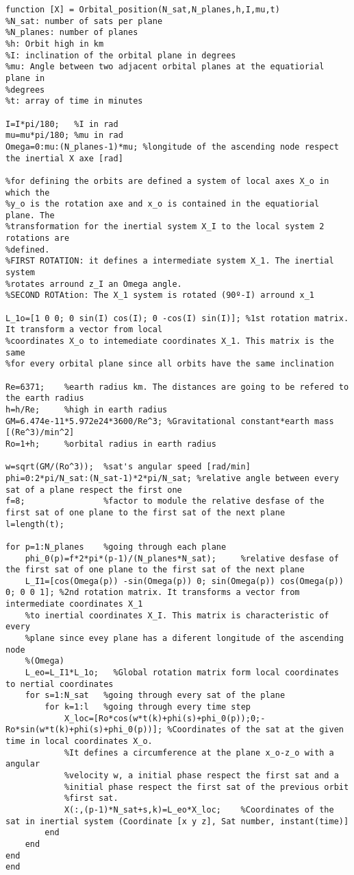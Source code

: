 \documentclass[10pt,a4paper]{article}
\author{Sergi Tarroc}
\begin{document}
\begin{lstlisting}
function [X] = Orbital_position(N_sat,N_planes,h,I,mu,t)
%N_sat: number of sats per plane
%N_planes: number of planes
%h: Orbit high in km
%I: inclination of the orbital plane in degrees
%mu: Angle between two adjacent orbital planes at the equatiorial plane in
%degrees
%t: array of time in minutes

I=I*pi/180;   %I in rad
mu=mu*pi/180; %mu in rad
Omega=0:mu:(N_planes-1)*mu; %longitude of the ascending node respect the inertial X axe [rad]

%for defining the orbits are defined a system of local axes X_o in which the
%y_o is the rotation axe and x_o is contained in the equatiorial plane. The
%transformation for the inertial system X_I to the local system 2 rotations are
%defined. 
%FIRST ROTATION: it defines a intermediate system X_1. The inertial system
%rotates arround z_I an Omega angle. 
%SECOND ROTAtion: The X_1 system is rotated (90º-I) arround x_1

L_1o=[1 0 0; 0 sin(I) cos(I); 0 -cos(I) sin(I)]; %1st rotation matrix. It transform a vector from local
%coordinates X_o to intemediate coordinates X_1. This matrix is the same
%for every orbital plane since all orbits have the same inclination

Re=6371;    %earth radius km. The distances are going to be refered to the earth radius
h=h/Re;     %high in earth radius
GM=6.474e-11*5.972e24*3600/Re^3; %Gravitational constant*earth mass [(Re^3)/min^2]
Ro=1+h;     %orbital radius in earth radius

w=sqrt(GM/(Ro^3));  %sat's angular speed [rad/min]
phi=0:2*pi/N_sat:(N_sat-1)*2*pi/N_sat; %relative angle between every sat of a plane respect the first one
f=8;                %factor to module the relative desfase of the first sat of one plane to the first sat of the next plane
l=length(t);

for p=1:N_planes    %going through each plane
    phi_0(p)=f*2*pi*(p-1)/(N_planes*N_sat);     %relative desfase of the first sat of one plane to the first sat of the next plane
    L_I1=[cos(Omega(p)) -sin(Omega(p)) 0; sin(Omega(p)) cos(Omega(p)) 0; 0 0 1]; %2nd rotation matrix. It transforms a vector from intermediate coordinates X_1
    %to inertial coordinates X_I. This matrix is characteristic of every
    %plane since evey plane has a diferent longitude of the ascending node
    %(Omega)
    L_eo=L_I1*L_1o;   %Global rotation matrix form local coordinates to nertial coordinates
    for s=1:N_sat   %going through every sat of the plane
        for k=1:l   %going through every time step
            X_loc=[Ro*cos(w*t(k)+phi(s)+phi_0(p));0;-Ro*sin(w*t(k)+phi(s)+phi_0(p))]; %Coordinates of the sat at the given time in local coordinates X_o.
            %It defines a circumference at the plane x_o-z_o with a angular
            %velocity w, a initial phase respect the first sat and a
            %initial phase respect the first sat of the previous orbit
            %first sat.
            X(:,(p-1)*N_sat+s,k)=L_eo*X_loc;    %Coordinates of the sat in inertial system (Coordinate [x y z], Sat number, instant(time)]
        end
    end        
end
end
\end{lstlisting}
\end{document}
